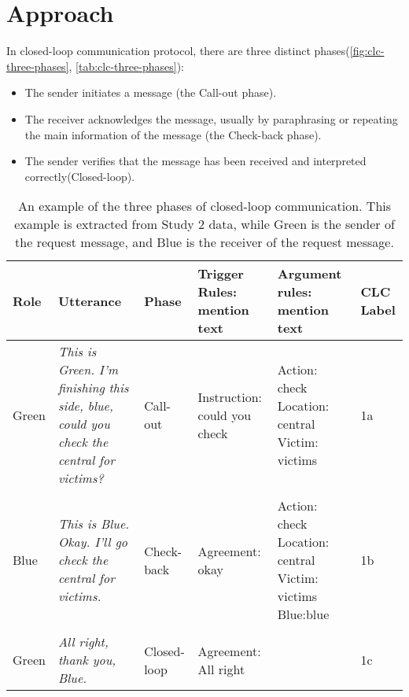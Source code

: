 \section{Approach}

In closed-loop communication protocol, there are three distinct
phases\citep{Hargestam.ea:2013}(\autoref{fig:clc-three-phases},
\autoref{tab:clc-three-phases}): 

\begin{itemize}

    \item The sender initiates a message (the Call-out phase).

    \item The receiver acknowledges the message, usually by paraphrasing or
        repeating the main information of the message (the Check-back phase).

    \item The sender verifies that the message has been received and
        interpreted correctly(Closed-loop).

\end{itemize}

\newcommand{\utteranceone}{\textit{This is Green. I’m finishing this side, blue, could you check the central for victims? }} 
\newcommand{\utterancetwo}{\textit{This is Blue. Okay. I’ll go check the central for victims.}}
\newcommand{\utterancethree}{\textit{All right, thank you, Blue.}}

\begin{table}
    \footnotesize
    \centering
    \begin{tabularx}{6in}{lXlp{1.2in}p{1in}p{0.4in}}
        \toprule
        Role  & Utterance         & Phase       & Trigger Rules: mention text  & Argument rules: mention text                                                         & CLC Label\\\midrule
        Green & \utteranceone{}   & Call-out    & Instruction: could you check & Action: check \newline Location: central \newline Victim: victims                    & 1a\\\\
        Blue  & \utterancetwo{}   & Check-back  & Agreement: okay              & Action: check \newline Location: central \newline Victim: victims \newline Blue:blue & 1b\\\\
        Green & \utterancethree{} & Closed-loop & Agreement: All right         &                                                                                      & 1c\\
        \bottomrule
    \end{tabularx}
    \caption{%
        An example of the three phases of closed-loop communication. This
        example is extracted from Study 2 data, while Green is the sender of the
        request message, and Blue is the receiver of the request message.
    }
    \label{tab:clc-three-phases}
\end{table}

